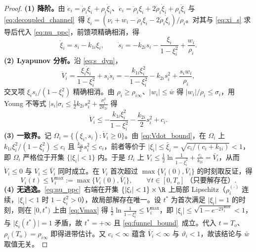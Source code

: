 \begin{proof}
\textbf{(1) 降阶。}由 \(\dot e_i=\dot\rho_i\xi_i+\rho_i\dot\xi_i\)、\(\ddot e_i=\ddot\rho_i\xi_i+2\dot\rho_i\dot\xi_i+\rho_i\ddot\xi_i\) 与 \eqref{eq:decoupled_channel}~得 \(\ddot\xi_i=(\nu_i+w_i-\ddot\rho_i\xi_i-2\dot\rho_i\dot\xi_i)/\rho_i\)。对其与 \eqref{eq:xi_s} 求导后代入 \eqref{eq:nu_ppc}，前馈项精确相消，得
\begin{equation}
\dot\xi_i=s_i-k_{1i}\xi_i,\qquad
\dot s_i=-k_{2i}s_i-\frac{\xi_i}{1-\xi_i^{2}}+\frac{w_i}{\rho_i}.
\label{eq:s_dyn}
\end{equation}
\textbf{(2) Lyapunov 分析。}沿 \eqref{eq:s_dyn}，
\begin{equation}
\dot V_i=\frac{\xi_i\dot\xi_i}{1-\xi_i^{2}}+s_i\dot s_i
=-\frac{k_{1i}\xi_i^{2}}{1-\xi_i^{2}}-k_{2i}s_i^{2}+\frac{s_iw_i}{\rho_i},
\label{eq:Vdot}
\end{equation}
交叉项 \(\xi_is_i/(1-\xi_i^2)\) 精确相消。由 \(\rho_i\ge\rho_{i\infty}\)、\(\lvert w_i\rvert\le\bar w\) 得 \(\lvert w_i\rvert/\rho_i\le\sigma_i\)，用 Young 不等式 \(\lvert s_i\rvert\sigma_i\le\frac12k_{2i}s_i^2+\frac{\sigma_i^2}{2k_{2i}}\) 得
\begin{equation}
\dot V_i\le-\frac{k_{1i}\xi_i^{2}}{1-\xi_i^{2}}-\frac{k_{2i}}{2}s_i^{2}+c_i .
\label{eq:Vdot_bound}
\end{equation}
\textbf{(3) 一致界。}记 \(\Omega_i=\{(\xi_i,s_i):\dot V_i\ge0\}\)。由 \eqref{eq:Vdot_bound}，在 \(\Omega_i\) 上 \(k_{1i}\xi_i^2/(1-\xi_i^2)\le c_i\) 且 \(\frac{k_{2i}}{2}s_i^2\le c_i\)，前者等价于 \(\lvert\xi_i\rvert\le\bar\xi_i=\sqrt{c_i/(c_i+k_{1i})}<1\)，即 \(\Omega_i\) 严格位于开集 \(\{\lvert\xi_i\rvert<1\}\) 内。于是 \(\Omega_i\) 上
\(V_i\le\frac12\ln\frac{1}{1-\bar\xi_i^2}+\frac{c_i}{k_{2i}}=\bar V_i\)，从而 \(\dot V_i\le0\) 与 \(V_i\le\bar V_i\) 同时成立。在 \(V_i\) 首次超过 \(\max\{V_i(0),\bar V_i\}\) 的时刻取反证，得
\begin{equation}
V_i(t)\le V_i^{\max}:=\max\{V_i(0),\bar V_i\},\qquad\forall t\in[0,T_o]\ \text{（只要解存在）}.
\label{eq:Vmax}
\end{equation}
\textbf{(4) 无逃逸。}\eqref{eq:nu_ppc}~右端在开集 \(\{\lvert\xi_i\rvert<1\}\times\R\) 上局部 Lipschitz（\(\rho_i^{(\cdot)}\) 连续，\(\lvert\xi_i\rvert<1\) 时 \(1-\xi_i^2>0\)），故局部解存在唯一。设 \(t^\ast\) 为首次满足 \(\lvert\xi_i\rvert=1\) 的时刻，则在 \([0,t^\ast)\) 上由 \eqref{eq:Vmax} 得 \(\frac12\ln\frac{1}{1-\xi_i^2}\le V_i^{\max}\)，即 \(\lvert\xi_i\rvert\le\sqrt{1-e^{-2V_i^{\max}}}<1\)，与 \(\lvert\xi_i(t^\ast)\rvert=1\) 矛盾，故 \(t^\ast=+\infty\) 且 \eqref{eq:funnel_bound}~成立。代入 \(t=T_o\)、\(\rho_i(T_o)=\rho_{i\infty}\) 即得进带估计。又 \(c_i<\infty\) 蕴含 \(\bar V_i<\infty\) 与 \(\vartheta_i<1\)，故该结论与 \(\bar w\) 取值无关。
\end{proof}

